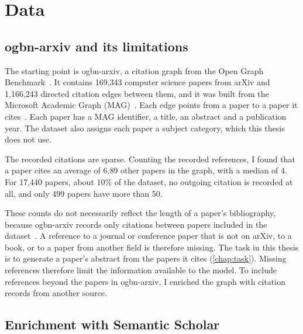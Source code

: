 \chapter{Data}
\label{chap:data}

\section{ogbn-arxiv and its limitations}
\label{sec:ogbn-arxiv}

The starting point is ogbn-arxiv, a citation graph from the Open Graph Benchmark~\cite{hu2020open}. It contains 169,343 computer science papers from arXiv and 1,166,243 directed citation edges between them, and it was built from the Microsoft Academic Graph (MAG)~\cite{hu2020open,wang2020microsoft}. Each edge points from a paper to a paper it cites~\cite{hu2020open}. Each paper has a MAG identifier, a title, an abstract and a publication year. The dataset also assigns each paper a subject category, which this thesis does not use.

The recorded citations are sparse. Counting the recorded references, I found that a paper cites an average of 6.89 other papers in the graph, with a median of 4. For 17,440 papers, about 10\% of the dataset, no outgoing citation is recorded at all, and only 499 papers have more than 50.

These counts do not necessarily reflect the length of a paper's bibliography, because ogbn-arxiv records only citations between papers included in the dataset~\cite{hu2020open}. A reference to a journal or conference paper that is not on arXiv, to a book, or to a paper from another field is therefore missing. The task in this thesis is to generate a paper's abstract from the papers it cites (\autoref{chap:task}). Missing references therefore limit the information available to the model. To include references beyond the papers in ogbn-arxiv, I enriched the graph with citation records from another source.

\section{Enrichment with Semantic Scholar}
\label{sec:enrichment}

